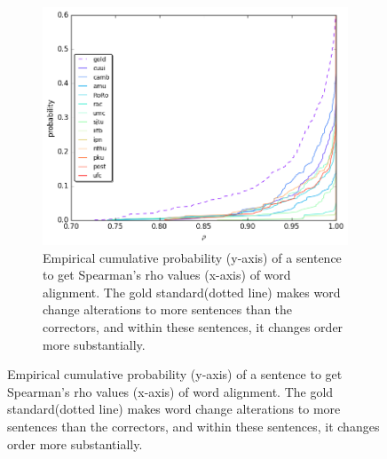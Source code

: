 \documentclass[letter,11pt]{article}
\newcommand{\com}[1]{}
\begin{document}
{\begin{figure}[tbp]
  \begin{subfigure}[]{0.4\textwidth}
  	\com{\caption{\label{fig:rho}}}
    \includegraphics[width = \textwidth]{spearman_ecdf}
    \caption{Empirical cumulative probability (y-axis) of a sentence to get Spearman's rho values (x-axis) of word alignment. The gold standard(dotted line) makes word change alterations to more sentences than the correctors, and within these sentences, it changes order more substantially.\label{fig:rho}}
  \end{subfigure}


\end{figure}}
\end{document}
